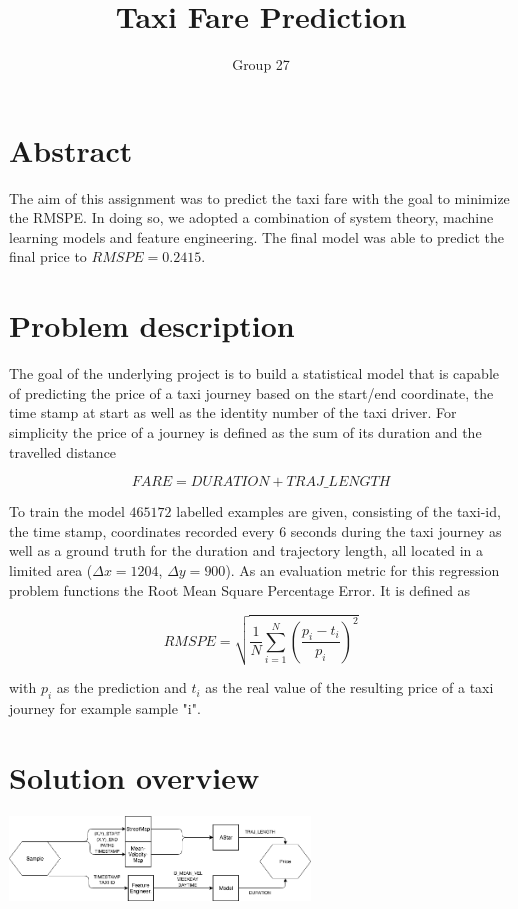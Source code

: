 \documentclass{article}
\title{\LARGE \bf Taxi Fare Prediction}
\author{Group 27}
\date{\vspace{-5ex}}
\newenvironment{Figure}
{\par\medskip\noindent\minipage{\linewidth}}
{\endminipage\par\medskip}
\begin{document}
\maketitle
\thispagestyle{empty}
\pagestyle{empty}

\parindent 0pt

\begin{multicols}{2}

\section*{Abstract}
The aim of this assignment was to predict the taxi fare with the goal to minimize the RMSPE. In doing so, we adopted a combination of system theory, machine learning models and feature engineering. The final model was able to predict the final price to $RMSPE=0.2415$.

\section{Problem description}
The goal of the underlying project is to build a statistical model that is capable of predicting the price of a taxi journey based on the start/end coordinate, the time stamp at start as well as the identity number of the taxi driver. For simplicity the price of a journey is defined as the sum of its duration and the travelled distance

$$FARE = DURATION + TRAJ\_LENGTH$$

To train the model $465172$ labelled examples are given, consisting of the taxi-id, the time stamp, coordinates recorded every 6 seconds during the taxi journey as well as a ground truth for the duration and trajectory length, all located in a limited area ($\Delta x = 1204$, $\Delta y = 900$). As an evaluation metric for this regression problem functions the Root Mean Square Percentage Error. It is defined as

$$ RMSPE = \sqrt{\frac{1}{N} \sum_{i=1}^N (\frac{p_i - t_i}{p_i})^2} $$

with $p_i$ as the prediction and $t_i$ as the real value of the resulting price of a taxi journey for example sample "i". 

\section{Solution overview}

\begin{Figure}
\begin{center}
\includegraphics[width=8cm]{Predictor_seperate.png}
\end{center}
\label{fig:prediction_chain}
\end{Figure}


\end{multicols}
\end{document}
